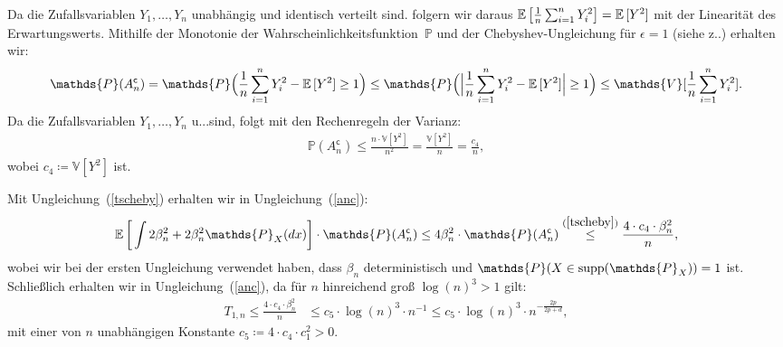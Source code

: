 {Da die Zufallsvariablen $Y_1,\dots,Y_n$ unabhängig und identisch verteilt sind. 
folgern wir daraus $\mathbb{E}\,\big[\frac{1}{n} \sum_{i = 1}^n Y_i^2\big] = \mathbb{E}\,[Y^2]$ mit der Linearität des Erwartungswerts.
Mithilfe der Monotonie der Wahrscheinlichkeitsfunktion~$\mathds{P}$ und der Chebyshev-Ungleichung für $\epsilon = 1$ (siehe z.\@B.\@ \cite[Satz 5.11]{Klenke2013}) erhalten wir:
\begin{equation*}
\begin{split}
\mathds{P}(A_n^{\mathsf{c}}) = \mathds{P}\Big(\frac{1}{n}\sum_{i=1}^n Y_i^2 - \E[Y^2] \geq 1\Big)
\leq \mathds{P}\Big(\Big|\frac{1}{n}\sum_{i=1}^n Y_i^2 - \E[Y^2]\Big| \geq 1\Big)
\leq \mathds{V}[\frac{1}{n}\sum_{i = 1}^nY_i^2].
\end{split}
\end{equation*}
Da die Zufallsvariablen $Y_1,\dots,Y_n$ u.\@i.\@v.\@ sind, folgt mit den Rechenregeln der Varianz:
\begin{equation}
\label{tscheby}
\begin{split}
\mathds{P}(A_n^{\mathsf{c}}) \leq \frac{n \cdot  \mathds{V}[Y^2]}{n^2}
= \frac{\mathds{V}[Y^2]}{n}
= \frac{c_4}{n},
\end{split}
\end{equation}
wobei $c_4 \coloneqq \mathds{V}[Y^2]$ ist. 

Mit Ungleichung~(\ref{tscheby}) erhalten wir in Ungleichung~(\ref{anc}):
\begin{equation*}
\begin{split}
 \E \bigg[\int  2\beta_n^2 + 2\beta_n^2 \mathds{P}_X(dx)\bigg] \cdot \mathds{P}(A_n^{\mathsf{c}})
  \leq 4\beta_n^2 \cdot \mathds{P}(A_n^{\mathsf{c}}) 
  \stackrel{(\ref{tscheby})}{\leq} \frac{4 \cdot c_4 \cdot \beta_n^2}{n},
\end{split}
\end{equation*}
wobei wir bei der ersten Ungleichung verwendet haben, dass $\beta_n$ deterministisch und $\mathds{P}(X \in \supp(\mathds{P}_X)) = 1$ ist.
Schließlich erhalten wir in Ungleichung~(\ref{anc}), da für $n$ hinreichend groß $\log(n)^3 > 1$ gilt:
\begin{equation}
\label{6thsum}
\begin{split}
T_{1,n} \leq \frac{4 \cdot c_4 \cdot \beta_n^2}{n} & \leq c_{5} \cdot \log(n)^3 \cdot n^{-1} \leq c_{5} \cdot \log(n)^3 \cdot n^{- \frac{2p}{2p + d}},
\end{split}
\end{equation} 
mit einer von $n$ unabhängigen Konstante $c_{5} \coloneqq 4 \cdot c_4 \cdot c_1^2 > 0$.

}
